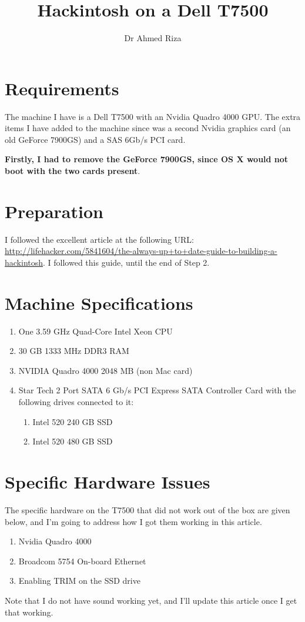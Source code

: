 \documentclass[11pt]{article}
\begin{document}
\title{Hackintosh on a Dell T7500}
\author{Dr Ahmed Riza}
\date{}
\maketitle

\section{Requirements}
The machine I have is a Dell T7500 with an Nvidia Quadro 4000 GPU.  The extra items I have added to the machine since was a second Nvidia graphics card (an old GeForce 7900GS) and a SAS 6Gb/s PCI card.

{\bf Firstly, I had to remove the GeForce 7900GS, since OS X would not boot with the two cards present}.

\section{Preparation}
\label{prep}
I followed the excellent article at the following URL:
\url{http://lifehacker.com/5841604/the-always-up+to+date-guide-to-building-a-hackintosh}.
I followed this guide, until the end of Step 2.

\section{Machine Specifications}
\begin{enumerate}
\item One 3.59 GHz Quad-Core Intel Xeon CPU
\item 30 GB 1333 MHz DDR3 RAM
\item NVIDIA Quadro 4000 2048 MB (non Mac card)
\item Star Tech 2 Port SATA 6 Gb/s PCI Express SATA Controller Card
  with the following drives connected to it:
\begin{enumerate}
\item Intel 520 240 GB SSD
\item Intel 520 480 GB SSD
\end{enumerate}
\end{enumerate}

\section{Specific Hardware Issues}
The specific hardware on the T7500 that did not work out of the box are given below, and I'm going to address how I got them working in this article.
\begin{enumerate}
\item Nvidia Quadro 4000
\item Broadcom 5754 On-board Ethernet 
\item Enabling TRIM on the SSD drive
\end{enumerate}
Note that I do not have sound working yet, and I'll update this article once I get that working.
\end{document}
